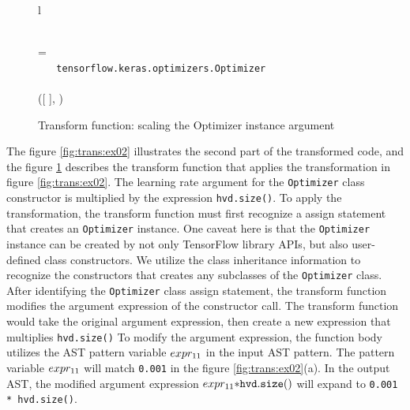 \begin{figure}[ht!]
  \centering
  \begin{tabular}{l}

  \\

   = \\

  \inden \ktif ~  \ktsubtysubs{\smodenv} ~ {\tt tensorflow.keras.optimizers.Optimizer}\\
  \inden \ktthen \\

  \inden\inden ([ \oassign {} ], )\\

  \end{tabular}
  \caption{Transform function: scaling the Optimizer instance argument}
  \label{fig:trans:fn02}
\end{figure}


The figure \ref{fig:trans:ex02} illustrates the second part of the transformed 
code, and the figure \ref{fig:trans:fn02} describes the transform function 
that applies the transformation in figure \ref{fig:trans:ex02}.
The learning rate argument for the {\tt Optimizer} class constructor is 
multiplied by the expression {\tt hvd.size()}. 
To apply the transformation, the transform function must first recognize a
assign statement that creates an {\tt Optimizer} instance.
One caveat here is that the {\tt Optimizer} instance can be 
created by not only TensorFlow library APIs, but also
user-defined class constructors. We utilize the class inheritance information to
recognize the constructors that creates any subclasses of the {\tt Optimizer}
class. 
After identifying the {\tt Optimizer} class assign statement, 
the transform function modifies the argument expression of the
constructor call.
The transform function would take the original argument expression,
then create a new expression that multiplies {\tt hvd.size()}
To modify the argument expression, the function body utilizes the AST pattern
variable $expr_{11}$ in the input AST pattern.
The pattern variable $expr_{11}$ will match {\tt 0.001} in the figure
\ref{fig:trans:ex02}(a).
In the output AST, the modified argument expression 
$expr_{11} {\tt * hvd.size()}$ will expand to {\tt 0.001 * hvd.size()}.

